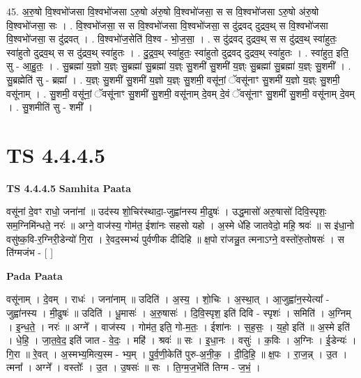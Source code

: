 \documentclass[17pt]{extarticle}
\begin{document}
45. अ॒रु॒षो वि॒श्वभो॑जसा वि॒श्वभो॑जसा ऽरु॒षो अ॑रु॒षो वि॒श्वभो॑जसा॒ स स वि॒श्वभो॑जसा ऽरु॒षो अ॑रु॒षो वि॒श्वभो॑जसा॒ सः । . वि॒श्वभो॑जसा॒ स स वि॒श्वभो॑जसा वि॒श्वभो॑जसा॒ स दु॑द्रवद् दुद्रव॒थ् स वि॒श्वभो॑जसा वि॒श्वभो॑जसा॒ स दु॑द्रवत् । . वि॒श्वभो॑ज॒सेति॑ वि॒श्व - भो॒ज॒सा॒ । . स दु॑द्रवद् दुद्रव॒थ् स स दु॑द्रव॒थ् स्वा॑हुतः॒ स्वा॑हुतो दुद्रव॒थ् स स दु॑द्रव॒थ् स्वा॑हुतः । . दु॒द्र॒व॒थ् स्वा॑हुतः॒ स्वा॑हुतो दुद्रवद् दुद्रव॒थ् स्वा॑हुतः । . स्वा॑हुत॒ इति॒ सु - आ॒हु॒तः॒ । . सु॒ब्रह्मा॑ य॒ज्ञो य॒ज्ञ्ः सु॒ब्रह्मा॑ सु॒ब्रह्मा॑ य॒ज्ञ्ः सु॒शमी॑ सु॒शमी॑ य॒ज्ञ्ः सु॒ब्रह्मा॑ सु॒ब्रह्मा॑ य॒ज्ञ्ः सु॒शमी᳚ । . सु॒ब्रह्मेति॑ सु - ब्रह्मा᳚ । . य॒ज्ञ्ः सु॒शमी॑ सु॒शमी॑ य॒ज्ञो य॒ज्ञ्ः सु॒शमी॒ वसू॑नां॒ ॅवसू॑नाꣳ सु॒शमी॑ य॒ज्ञो य॒ज्ञ्ः सु॒शमी॒ वसू॑नाम् । . सु॒शमी॒ वसू॑नां॒ ॅवसू॑नाꣳ सु॒शमी॑ सु॒शमी॒ वसू॑नाम् दे॒वम् दे॒वं ॅवसू॑नाꣳ सु॒शमी॑ सु॒शमी॒ वसू॑नाम् दे॒वम् । . सु॒शमीति॑ सु - शमी᳚ । \newline
\pagebreak
{}

\section{ TS 4.4.4.5 }

\textbf{TS 4.4.4.5 } \newline
\textbf{Samhita Paata} \newline

वसू॑नां दे॒वꣳ राधो॒ जना॑नां ॥ उद॑स्य शो॒चिर॑स्थादा॒-जुह्वा॑नस्य मी॒ढुषः॑ । उद्ध॒मासो॑ अरु॒षासो॑ दिवि॒स्पृशः॒ सम॒ग्निमि॑न्धते॒ नरः॑ ॥ अग्ने॒ वाज॑स्य॒ गोम॑त॒ ईशा॑नः सहसो यहो । अ॒स्मे धे॑हि जातवेदो॒ महि॒ श्रवः॑ ॥ स इ॑धा॒नो वसु॑ष्क॒वि-र॒ग्निरी॒डेन्यो॑ गि॒रा । रे॒वद॒स्मभ्यं॑ पुर्वणीक दीदिहि ॥ क्ष॒पो रा॑जन्नु॒त त्मनाऽग्ने॒ वस्तो॑रु॒तोषसः॑ । स ति॑ग्मजंभ - [  ] \newline

\textbf{Pada Paata} \newline

वसू॑नाम् । दे॒वम् । राधः॑ । जना॑नाम् ॥ उदिति॑ । अ॒स्य॒ । शो॒चिः । अ॒स्था॒त् । आ॒जुह्वा॑न॒स्येत्या᳚ - जुह्वा॑नस्य । मी॒ढुषः॑ ॥ उदिति॑ । धू॒मासः॑ । अ॒रु॒षासः॑ । दि॒वि॒स्पृश॒ इति॑ दिवि - स्पृशः॑ । समिति॑ । अ॒ग्निम् । इ॒न्ध॒ते॒ । नरः॑ ॥ अग्ने᳚ । वाज॑स्य । गोम॑त॒ इति॒ गो-म॒तः॒ । ईशा॑नः । स॒ह॒सः॒ । य॒हो॒ इति॑ ॥ अ॒स्मे इति॑ । धे॒हि॒ । जा॒त॒वे॒द॒ इति॑ जात - वे॒दः॒ । महि॑ । श्रवः॑ ॥ सः । इ॒धा॒नः । वसुः॑ । क॒विः । अ॒ग्निः । ई॒डेन्यः॑ । गि॒रा ॥ रे॒वत् । अ॒स्मभ्य॒मित्य॒स्म - भ्य॒म् । पु॒र्व॒णी॒केति॑ पुरु-अ॒नी॒क॒ । दी॒दि॒हि॒ ॥ क्ष॒पः । रा॒ज॒न्न् । उ॒त । त्मना᳚ । अग्ने᳚ । वस्तोः᳚ । उ॒त । उ॒षसः॑ ॥ सः । ति॒ग्म॒ज॒भेंति॑ तिग्म - ज॒भं॒ ।  \newline
\end{document}
